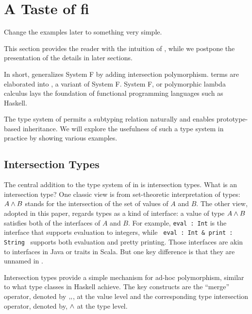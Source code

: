 \section{A Taste of fi}

\begin{footnote}
  Change the examples later to something very simple.
\end{footnote}

This section provides the reader with the intuition of \name, while we postpone
the presentation of the details in later sections.

In short, \name generalizes System F by adding intersection polymorphism. \name terms
are elaborated into \Target, a variant of System F. System F, or polymorphic
lambda calculus lays the foundation of functional programming languages such as
Haskell.

The type system of \name permits a subtyping relation naturally and enables
prototype-based inheritance. We will explore the usefulness of such a type
system in practice by showing various examples.

\subsection{Intersection Types}

The central addition to the type system of \target in \name is intersection types. What
is an intersection type? One classic view is from set-theoretic interpretation
of types: $ A \wedge B $ stands for the intersection of the set of values of
$ A $ and $ B $. The other view, adopted in this paper, regards
types as a kind of interface: a value of type $ A \wedge B $ satisfies both
of the interfaces of $ A $ and $ B $. For example,
\lstinline{eval : Int} is the interface that supports evaluation to integers,
while \lstinline{ eval : Int & print : String } supports both evaluation and
pretty printing. Those interfaces are akin to interfaces in Java or traits in
Scala. But one key difference is that they are unnamed in \name.

Intersection types provide a simple mechanism for ad-hoc polymorphism, similar
to what type classes in Haskell achieve. The key constructs are the ``merge''
operator, denoted by $ ,\!, $, at the value level and the corresponding type
intersection operator, denoted by, $ \wedge $ at the type level.

